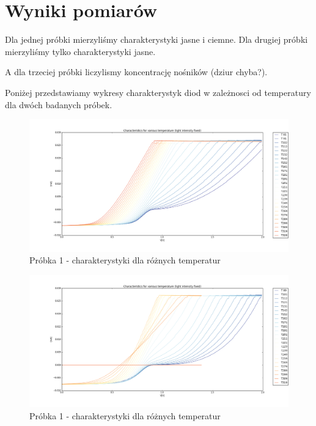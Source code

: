 \documentclass[a4paper,12pt]{article}
\begin{document}
\section{Wyniki pomiarów}

Dla jednej próbki mierzyliśmy charakterystyki jasne i ciemne.
Dla drugiej próbki mierzyliśmy tylko charakterystyki jasne.

A dla trzeciej próbki liczylismy koncentrację nośników (dziur chyba?).

Poniżej przedstawiamy wykresy charakterystyk diod w zależnosci od temperatury dla dwóch badanych próbek.

\begin{figure} [H]
  \begin{center}
    \includegraphics[width = 15cm]{probka1_temperatura.png}
    \caption{Próbka 1 - charakterystyki dla różnych temperatur}
  \end{center}
\end{figure}

\begin{figure} [H]
  \begin{center}
    \includegraphics[width = 15cm]{probka2_temperatura.png}
    \caption{Próbka 1 - charakterystyki dla różnych temperatur}
  \end{center}
\end{figure}
\end{document}
